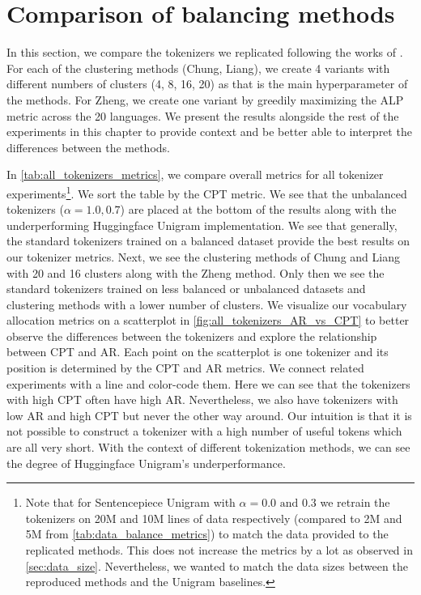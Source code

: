 \section{Comparison of balancing methods}
\label{sec:comparison_balancing_methods}



In this section, we compare the tokenizers we replicated following the works of \citet{chung_improving_2020,zheng_allocating_2021,liang_xlm-v_2023}. For each of the clustering methods (Chung, Liang), we create 4 variants with different numbers of clusters (4, 8, 16, 20) as that is the main hyperparameter of the methods. For Zheng, we create one variant by greedily maximizing the ALP metric across the 20 languages. We present the results alongside the rest of the experiments in this chapter to provide context and be better able to interpret the differences between the methods.

In \autoref{tab:all_tokenizers_metrics}, we compare overall metrics for all tokenizer experiments\footnote{Note that for Sentencepiece Unigram with $\alpha=0.0\text{ and }0.3$ we retrain the tokenizers on 20M and 10M lines of data respectively (compared to 2M and 5M from \autoref{tab:data_balance_metrics}) to match the data provided to the replicated methods. This does not increase the metrics by a lot as observed in \autoref{sec:data_size}. Nevertheless, we wanted to match the data sizes between the reproduced methods and the Unigram baselines.}. We sort the table by the CPT metric. We see that the unbalanced tokenizers ($\alpha=1.0, 0.7$) are placed at the bottom of the results along with the underperforming Huggingface Unigram implementation. We see that generally, the standard tokenizers trained on a balanced dataset provide the best results on our tokenizer metrics. Next, we see the clustering methods of Chung and Liang with 20 and 16 clusters along with the Zheng method. Only then we see the standard tokenizers trained on less balanced or unbalanced datasets and clustering methods with a lower number of clusters. We visualize our vocabulary allocation metrics on a scatterplot in \autoref{fig:all_tokenizers_AR_vs_CPT} to better observe the differences between the tokenizers and explore the relationship between CPT and AR. Each point on the scatterplot is one tokenizer and its position is determined by the CPT and AR metrics. We connect related experiments with a line and color-code them. Here we can see that the tokenizers with high CPT often have high AR. Nevertheless, we also have tokenizers with low AR and high CPT but never the other way around. Our intuition is that it is not possible to construct a tokenizer with a high number of useful tokens which are all very short. With the context of different tokenization methods, we can see the degree of Huggingface Unigram's underperformance.

